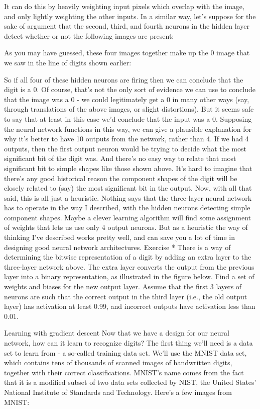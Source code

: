 It can do this by heavily weighting input pixels which overlap with the image, and only lightly weighting the other inputs. In a similar way, let's suppose for the sake of argument that the second, third, and fourth neurons in the hidden layer detect whether or not the following images are present:

As you may have guessed, these four images together make up the 0 image that we saw in the line of digits shown earlier:

So if all four of these hidden neurons are firing then we can conclude that the digit is a 0. Of course, that's not the only sort of evidence we can use to conclude that the image was a 0 - we could legitimately get a 0 in many other ways (say, through translations of the above images, or slight distortions). But it seems safe to say that at least in this case we'd conclude that the input was a 0.
Supposing the neural network functions in this way, we can give a plausible explanation for why it's better to have 10 outputs from the network, rather than 4. If we had 4 outputs, then the first output neuron would be trying to decide what the most significant bit of the digit was. And there's no easy way to relate that most significant bit to simple shapes like those shown above. It's hard to imagine that there's any good historical reason the component shapes of the digit will be closely related to (say) the most significant bit in the output.
Now, with all that said, this is all just a heuristic. Nothing says that the three-layer neural network has to operate in the way I described, with the hidden neurons detecting simple component shapes. Maybe a clever learning algorithm will find some assignment of weights that lets us use only 4 output neurons. But as a heuristic the way of thinking I've described works pretty well, and can save you a lot of time in designing good neural network architectures.
Exercise
* There is a way of determining the bitwise representation of a digit by adding an extra layer to the three-layer network above. The extra layer converts the output from the previous layer into a binary representation, as illustrated in the figure below. Find a set of weights and biases for the new output layer. Assume that the first 3 layers of neurons are such that the correct output in the third layer (i.e., the old output layer) has activation at least 0.99, and incorrect outputs have activation less than 0.01. 

Learning with gradient descent
Now that we have a design for our neural network, how can it learn to recognize digits? The first thing we'll need is a data set to learn from - a so-called training data set. We'll use the MNIST data set, which contains tens of thousands of scanned images of handwritten digits, together with their correct classifications. MNIST's name comes from the fact that it is a modified subset of two data sets collected by NIST, the United States' National Institute of Standards and Technology. Here's a few images from MNIST:

